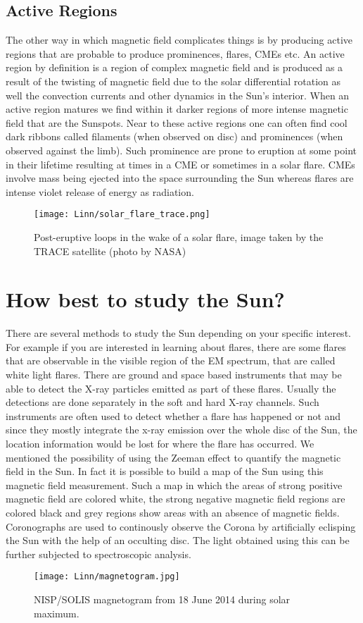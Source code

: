 \documentclass{../template/texnote}
\begin{document}
\subsection{Active Regions}
The other way in which magnetic field complicates things is by producing active regions that are probable to produce prominences, flares, CMEs etc.
An active region by definition is a region of complex magnetic field and is produced as a result of the twisting of magnetic field due to the solar differential rotation as well the convection currents and other dynamics in the Sun's interior.
When an active region matures we find within it darker regions of more intense magnetic field that are the Sunspots.
Near to these active regions one can often find cool dark ribbons called filaments (when observed on disc) and prominences (when observed against the limb).
Such prominence are prone to eruption at some point in their lifetime resulting at times in a CME or sometimes in a solar flare.
CMEs involve mass being ejected into the space surrounding the Sun whereas flares are intense violet release of energy as radiation.
\begin{figure}[htpb]
    \centering
    \texttt{[image: Linn/solar\_flare\_trace.png]}
    \caption{Post-eruptive loops in the wake of a solar flare, image taken by the TRACE satellite (photo by NASA)} 
    \label{fig:flare}
\end{figure}

\section{How best to study the Sun?}
There are several methods to study the Sun depending on your specific interest.
For example if you are interested in learning about flares, there are some flares that are observable in the visible region of the EM spectrum, that are called white light flares.
There are ground and space based instruments that may be able to detect the X-ray particles emitted as part of these flares. 
Usually the detections are done separately in the soft and hard X-ray channels.
Such instruments are often used to detect whether a flare has happened or not and since they mostly integrate the x-ray emission over the whole disc of the Sun, the location information would be lost for where the flare has occurred.
We mentioned the possibility of using the Zeeman effect to quantify the magnetic field in the Sun. %
In fact it is possible to build a map of the Sun using this magnetic field measurement.
Such a map in which the areas of strong positive magnetic field are colored white, the strong negative magnetic field regions are colored black and grey regions show areas with an absence of magnetic fields.
Coronographs are used to continously observe the Corona by artificially eclisping the Sun with the help of an occulting disc. 
The light obtained using this can be further subjected to spectroscopic analysis.
\begin{figure}[htpb]
    \centering
    \texttt{[image: Linn/magnetogram.jpg]}
    \caption{NISP/SOLIS magnetogram from 18 June 2014 during solar maximum.} 
    \label{fig:magnetogram}
\end{figure}
\end{document}

